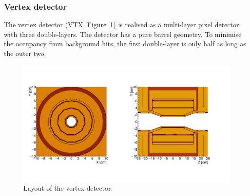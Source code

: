 \subsubsection*{\bf Vertex detector}

The vertex detector (VTX, Figure~\ref{fig:det:vertex}) is realised as a multi-layer pixel detector with three double-layers. The detector has a pure barrel geometry. To minimise the occupancy from background hits,
the first double-layer is only half as long as the outer two. 



\begin{figure}[t!]
\centering
\includegraphics[width=0.8\hsize]{Detector/fig/vertex.png}
\caption{Layout of the vertex detector.}
\label{fig:det:vertex}
\end{figure}

